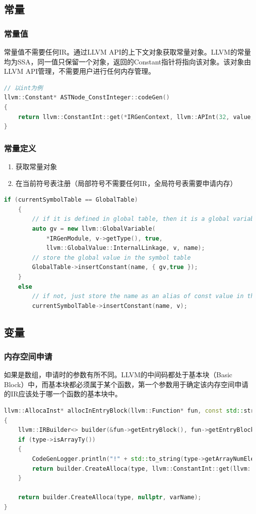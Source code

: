 \documentclass{article}
\begin{document}
\subsection{常量}
\subsubsection{常量值}
\par 常量值不需要任何IR。通过LLVM API的上下文对象获取常量对象。LLVM的常量均为SSA，同一值只保留一个对象，返回的Constant指针将指向该对象。该对象由LLVM API管理，不需要用户进行任何内存管理。
\begin{lstlisting}[language=C++]
// 以int为例
llvm::Constant* ASTNode_ConstInteger::codeGen()
{
    return llvm::ConstantInt::get(*IRGenContext, llvm::APInt(32, value, true));
}
\end{lstlisting}
\subsubsection{常量定义}
\begin{enumerate}
  \item 获取常量对象
  \item 在当前符号表注册（局部符号不需要任何IR，全局符号表需要申请内存）
\end{enumerate}
\begin{lstlisting}[language=C++]
if (currentSymbolTable == GlobalTable)
    {
        // if it is defined in global table, then it is a global variable
        auto gv = new llvm::GlobalVariable(
            *IRGenModule, v->getType(), true,
            llvm::GlobalValue::InternalLinkage, v, name);
        // store the global value in the symbol table
        GlobalTable->insertConstant(name, { gv,true });
    }
    else
        // if not, just store the name as an alias of const value in the symbol table
        currentSymbolTable->insertConstant(name, v);
\end{lstlisting}

\subsection{变量}
\subsubsection{内存空间申请}
\par 如果是数组，申请时的参数有所不同。LLVM的中间码都处于基本块（Basic Block）中，而基本块都必须属于某个函数，第一个参数用于确定该内存空间申请的IR应该处于哪一个函数的基本块中。
\begin{lstlisting}[language=C++]
llvm::AllocaInst* allocInEntryBlock(llvm::Function* fun, const std::string& varName, llvm::Type* type)
{
    llvm::IRBuilder<> builder(&fun->getEntryBlock(), fun->getEntryBlock().begin());
    if (type->isArrayTy())
    {
        CodeGenLogger.println("!" + std::to_string(type->getArrayNumElements())); //调试完忘记删了
        return builder.CreateAlloca(type, llvm::ConstantInt::get(llvm::Type::getInt32Ty(*IRGenContext), type->getArrayNumElements()), varName);
    }

    return builder.CreateAlloca(type, nullptr, varName);
}
\end{lstlisting}
\end{document}
